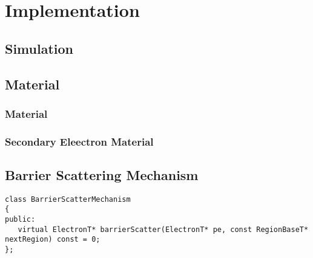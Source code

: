\chapter{Implementation}
\section{Simulation}

\section{Material}\label{sec:impl_mat}
\subsection{Material}
\subsection{Secondary Eleectron Material}

\section{Barrier Scattering Mechanism}\label{sec:impl_barrierSM}

\begin{lstlisting}
class BarrierScatterMechanism
{
public:
   virtual ElectronT* barrierScatter(ElectronT* pe, const RegionBaseT* nextRegion) const = 0;
};
\end{lstlisting}
